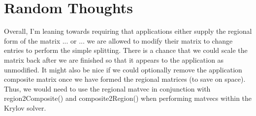 \documentclass[11pt]{article}
\begin{document}
\section{Random Thoughts}
Overall, I'm leaning towards requiring that applications either supply
the regional form of the matrix ... or ... we are allowed to modify
their matrix to change entries to perform the simple splitting. There
is a chance that we could scale the matrix back after we are finished
so that it appears to the application as unmodified. It might also be
nice if we could optionally remove the application composite matrix once
we have formed the regional matrices (to save on space). Thus, we would
need to use the regional matvec in conjunction with {\sf region2Composite()}
and {\sf composite2Region()} when performing matvecs within the Krylov solver.
\end{document}
